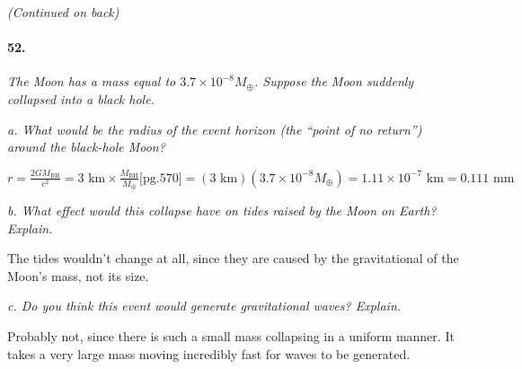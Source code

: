 \documentclass[letterpaper,11pt]{article}
\begin{document}
\begin{center}
	\it
	(Continued on back)
\end{center}
\pagebreak

\paragraph{52.}
\it
The Moon has a mass equal to $3.7 \times 10^{-8}M_\oplus$. Suppose the Moon suddenly collapsed into a black hole.
\smallskip
\par
\it
a. What would be the radius of the event horizon (the “point of no return”) around the black-hole Moon?
\smallskip
	\par
	\normalfont
	\begin{center}
	$
	\displaystyle
	r
	=
	\frac{2GM_{\textrm{BH}}}{c^2}
	=
	3 \textrm{ km} \times \frac{M_\textrm{BH}}{M_{\oplus}} \textrm{[pg.570]}
	=
	(3 \textrm{ km})( 3.7 \times 10^{-8}M_\oplus)
	=
	1.11 \times 10^{-7} \textrm{ km}
	=
	0.111 \textrm{ mm}
	$
	\end{center}
	\bigskip

\par
\it
b. What effect would this collapse have on tides raised by the Moon on Earth? Explain.
\smallskip
	\par
	\normalfont
	The tides wouldn't change at all, since they are caused by the gravitational of the Moon's mass, not its size.
	\bigskip

\par
\it
c. Do you think this event would generate gravitational waves? Explain.
\smallskip
	\par
	\normalfont
	Probably not, since there is such a small mass collapsing in a uniform manner. It takes a very large mass moving incredibly fast for waves to be generated.
\end{document}
